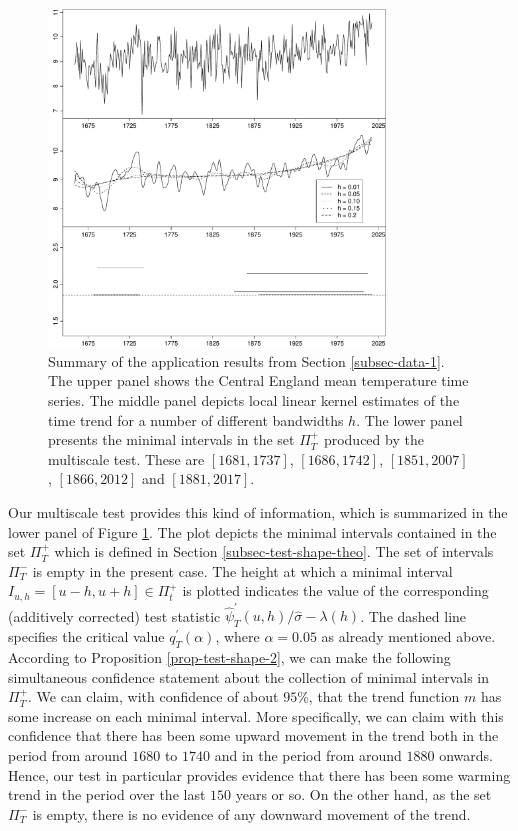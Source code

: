 \begin{figure}[t]
\centering
\includegraphics[width=0.8\textwidth]{Plots/threegraphics_testing_constant_method_ll.pdf}
\caption{Summary of the application results from Section \ref{subsec-data-1}. The upper panel shows the Central England mean temperature time series. The middle panel depicts local linear kernel estimates of the time trend for a number of different bandwidths $h$. The lower panel presents the minimal intervals in the set $\Pi_T^+$ produced by the multiscale test. These are $[1681,1737]$, $[1686,1742]$, $[1851,2007]$, $[1866,2012]$ and $[1881,2017]$.}\label{plot-results-app1}
\end{figure}


Our multiscale test provides this kind of information, which is summarized in the lower panel of Figure \ref{plot-results-app1}. The plot depicts the minimal intervals contained in the set $\Pi_T^+$ which is defined in Section \ref{subsec-test-shape-theo}. The set of intervals $\Pi_T^-$ is empty in the present case. The height at which a minimal interval $I_{u,h} = [u-h,u+h] \in \Pi_t^+$ is plotted indicates the value of the corresponding (additively corrected) test statistic $\widehat{\psi}^\prime_T(u,h) / \hat{\sigma} - \lambda(h)$. The dashed line specifies the critical value $q_T^\prime(\alpha)$, where $\alpha = 0.05$ as already mentioned above. According to Proposition \ref{prop-test-shape-2}, we can make the following simultaneous confidence statement about the collection of minimal intervals in $\Pi_T^+$. We can claim, with confidence of about $95\%$, that the trend function $m$ has some increase on each minimal interval. More specifically, we can claim with this confidence that there has been some upward movement in the trend both in the period from around $1680$ to $1740$ and in the period from around $1880$ onwards. Hence, our test in particular provides evidence that there has been some warming trend in the period over the last $150$ years or so. On the other hand, as the set $\Pi_T^-$ is empty, there is no evidence of any downward movement of the trend.  


